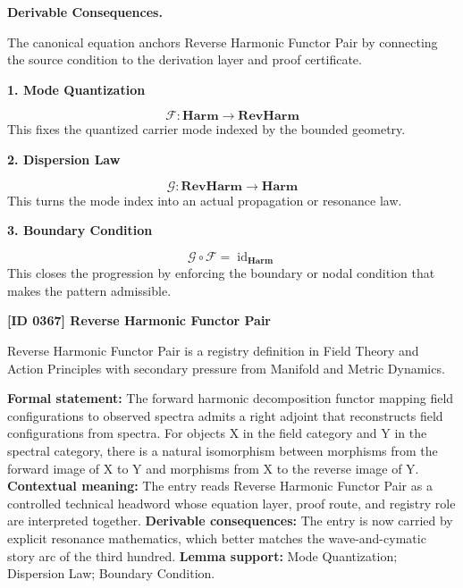 \par\vspace{0.35em}
\noindent\textbf{Derivable Consequences.}\quad
\begingroup
\footnotesize
\raggedright
The canonical equation anchors Reverse Harmonic Functor Pair by connecting the source condition to the derivation layer and proof certificate.
\par\endgroup

\noindent\textbf{1. Mode Quantization}\par
\[
\mathcal{F}:\mathbf{Harm}\to\mathbf{RevHarm}
\]
\noindent This fixes the quantized carrier mode indexed by the bounded geometry.\par
\noindent\textbf{2. Dispersion Law}\par
\[
\mathcal{G}:\mathbf{RevHarm}\to\mathbf{Harm}
\]
\noindent This turns the mode index into an actual propagation or resonance law.\par
\noindent\textbf{3. Boundary Condition}\par
\[
\mathcal{G}\circ\mathcal{F}=\operatorname{id}_{\mathbf{Harm}}
\]
\noindent This closes the progression by enforcing the boundary or nodal condition that makes the pattern admissible.\par

\clearpage
\noindent\textbf{[ID 0367] Reverse Harmonic Functor Pair}\par
\vspace{0.35em}
\begingroup\small
{}
Reverse Harmonic Functor Pair is a registry definition in Field Theory and Action Principles with secondary pressure from Manifold and Metric Dynamics.

\begingroup\footnotesize\setlength{\emergencystretch}{3em}\sloppy
\textbf{Formal statement:} The forward harmonic decomposition functor mapping field configurations to observed spectra admits a right adjoint that reconstructs field configurations from spectra. For objects X in the field category and Y in the spectral category, there is a natural isomorphism between morphisms from the forward image of X to Y and morphisms from X to the reverse image of Y. \textbf{Contextual meaning:} The entry reads Reverse Harmonic Functor Pair as a controlled technical headword whose equation layer, proof route, and registry role are interpreted together. \textbf{Derivable consequences:} The entry is now carried by explicit resonance mathematics, which better matches the wave-and-cymatic story arc of the third hundred. \textbf{Lemma support:} Mode Quantization; Dispersion Law; Boundary Condition.\par
\endgroup

